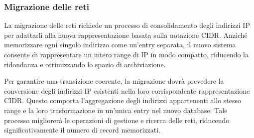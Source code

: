 \subsubsection{Migrazione delle reti}
La migrazione delle reti richiede un processo di consolidamento degli indirizzi IP per adattarli alla nuova rappresentazione basata sulla notazione CIDR. Anziché memorizzare ogni singolo indirizzo come un’entry separata, il nuovo sistema consente di rappresentare un intero range di IP in modo compatto, riducendo la ridondanza e ottimizzando lo spazio di archiviazione.

Per garantire una transizione coerente, la migrazione dovrà prevedere la conversione degli indirizzi IP esistenti nella loro corrispondente rappresentazione CIDR. Questo comporta l’aggregazione degli indirizzi appartenenti allo stesso range e la loro trasformazione in un’unica entry nel nuovo database. Tale processo migliorerà le operazioni di gestione e ricerca delle reti, riducendo significativamente il numero di record memorizzati.
